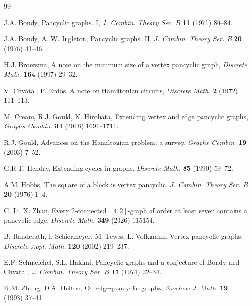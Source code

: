 \documentclass[12pt]{article}
\begin{document}
\begin{thebibliography}{99}

J.A. Bondy,
Pancyclic graphs. I,
\emph{J. Combin. Theory Ser. B} \textbf{11} (1971) 80--84.

J.A. Bondy, A. W. Ingleton,
Pancyclic graphs. II,
\emph{J. Combin. Theory Ser. B} \textbf{20} (1976) 41--46.

H.J. Broersma,
A note on the minimum size of a vertex pancyclic graph,
\emph{Discrete Math.} \textbf{164} (1997) 29--32.

V. Chv\'{a}tal,  P. Erd\H{o}s,
A note on Hamiltonian circuits,
\emph{Discrete Math.} \textbf{2} (1972) 111--113.

M. Cream, R.J. Gould, K. Hirohata,
Extending vertex and edge pancyclic graphs,
\emph{Graphs Combin.} \textbf{34} (2018) 1691--1711.

R.J. Gould,
Advances on the Hamiltonian problem: a survey,
\emph{Graphs Combin.} \textbf{19} (2003) 7--52.

G.R.T. Hendry,
Extending cycles in graphs,
\emph{Discrete Math.} \textbf{85} (1990) 59--72.

A.M. Hobbs,
The square of a block is vertex pancyclic,
\emph{J. Combin. Theory Ser. B} \textbf{20} (1976) 1--4.

C. Li, X. Zhan,
Every $2$-connected $[4,2]$-graph of order at least seven contains a pancyclic edge,
\emph{Discrete Math.} \textbf{349} (2026) 115154.

B. Randerath, I. Schiermeyer, M. Tewes, L. Volkmann,
Vertex pancyclic graphs,
\emph{Discrete Appl. Math.} \textbf{120} (2002) 219--237.

E.F. Schmeichel, S.L. Hakimi,
Pancyclic graphs and a conjecture of Bondy and Chv\'{a}tal,
\emph{J. Combin. Theory Ser. B} \textbf{17} (1974) 22--34.

K.M. Zhang, D.A. Holton,
On edge-pancyclic graphs,
\emph{Soochow J. Math.} \textbf{19} (1993) 37--41.

\end{thebibliography}
\end{document}
